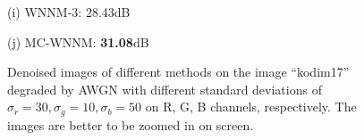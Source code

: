 \documentclass[10pt,onecolumn,letterpaper]{article}
\begin{document}
\begin{figure}[!htbp]
{\begin{minipage}[t]{0.25\textwidth}
{\footnotesize (i) WNNM-3: 28.43dB }
\end{minipage}
\begin{minipage}[t]{0.25\textwidth}
\centering
{}
{\footnotesize (j) MC-WNNM: \textbf{31.08}dB}
\end{minipage}
}
\caption{Denoised images of different methods on the image ``kodim17'' degraded by AWGN with different standard deviations of $\sigma_{r}=30, \sigma_{g}=10, \sigma_{b}=50$ on R, G, B channels, respectively. The images are better to be zoomed in on screen.}
\label{f3}
\end{figure}
\end{document}
